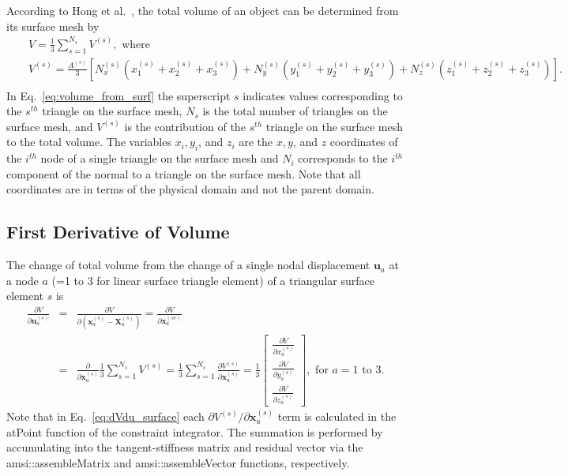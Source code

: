 \documentclass[12pt,aps,pre]{revtex4}
\begin{document}
According to Hong et al.\ \cite{Hong:2006vz}, the total volume of an object can be determined from its surface mesh by
%
\begin{eqnarray}
&&V = \frac{1}{3}\sum_{s=1}^{N_s} V^{(s)}, \text{ where } \nonumber\\
&&V^{(s)} =  \frac{A^{(s)}}{3}\left[ N^{(s)}_x (x^{(s)}_1 + x^{(s)}_2 + x^{(s)}_3) + N^{(s)}_y (y^{(s)}_1 + y^{(s)}_2 + y^{(s)}_3) + N^{(s)}_z (z^{(s)}_1 + z^{(s)}_2 + z^{(s)}_3) \right]. \nonumber\\
\label{eq:volume_from_surf}
\end{eqnarray}
% 
In Eq.\ \eqref{eq:volume_from_surf} the superscript $s$ indicates values corresponding to the $s^{th}$ triangle on the surface mesh, $N_s$ is the total number of triangles on the surface mesh, and $V^{(s)}$ is the contribution of the $s^{th}$ triangle on the surface mesh to the total volume. The variables $x_i, y_i$, and $z_i$ are the $x, y$, and $z$ coordinates of the $i^{th}$ node of a single triangle on the surface mesh and $N_i$ corresponds to the $i^{th}$ component of the normal to a triangle on the surface mesh. Note that all coordinates are in terms of the physical domain and not the parent domain.

\subsection{First Derivative of Volume}
The change of total volume from the change of a single nodal displacement $\pmb{u}_a$ at a node $a$ (=1 to 3 for linear surface triangle element) of a triangular surface element $s$ is
%
\begin{eqnarray}
\frac{\partial V}{\partial \pmb{u}_a^{(s)}} &=& \frac{\partial V}{\partial (\pmb{x}_a^{(s)}-\pmb{X}_a^{(s)})} = \frac{\partial V}{\partial \pmb{x}_a^{(se)}} \nonumber\\
&=& \frac{\partial}{\partial \pmb{x}_a^{(s)}} \frac{1}{3} \sum_{s=1}^{N_s}V^{(s)} = \frac{1}{3} \sum_{s=1}^{N_s}\frac{\partial V^{(s)}}{\partial \pmb{x}_a^{(s)}}
= \frac{1}{3} \begin{bmatrix}
\frac{\partial V}{\partial x_a^{(s)}} \\ \frac{\partial V}{\partial y_a^{(s)}} \\ \frac{\partial V}{\partial z_a^{(s)}}
\end{bmatrix}, \text { for } a = 1 \text{ to } 3.
\label{eq:dVdu_surface}
\end{eqnarray}
%
Note that in Eq.\ \eqref{eq:dVdu_surface} each $\partial V^{(s)}/\partial \pmb{x}_a^{(s)}$ term is calculated in the atPoint function of the constraint integrator. The summation is performed by accumulating into the tangent-stiffness matrix and residual vector via the amsi::assembleMatrix and amsi::assembleVector functions, respectively.
\end{document}
